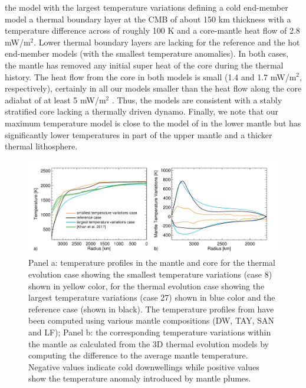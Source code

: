  the model with the largest temperature variations defining a cold end-member model  a thermal boundary layer at the CMB of about 150 km thickness with a temperature difference across of roughly 100 K and a core-mantle heat flow of 2.8 mW/m$^2$. Lower thermal boundary layers are lacking for the reference and the hot end-member models (with the smallest temperature anomalies). In both cases, the mantle has removed any initial super heat of the core during the thermal history. The heat flow from the core in both models is small (1.4 and 1.7 mW/m$^2$, respectively), certainly in all our models smaller than the heat flow along the core adiabat of at least 5 mW/m$^2$ \citep{Nimmo2000}. Thus, the models are consistent with a stably stratified core lacking a thermally driven dynamo. Finally, we note that our maximum temperature model is close to the model of \citet{Zharkov2009} in the lower mantle but has significantly lower temperatures in part of the upper mantle and a thicker thermal lithosphere. 
%
\begin{figure}[h!]
\begin{center}
\includegraphics[width=\textwidth]
{figures/Fig4ab.png}
\caption{Panel a: temperature profiles in the mantle and core for the thermal evolution case showing the smallest temperature variations (case 8) shown in yellow color, for the thermal evolution case showing the largest temperature variations (case 27) shown in blue color and the reference case (shown in black). The temperature profiles from \citet{Khan2018} have been computed using various mantle compositions (DW, TAY, SAN and LF); Panel b: the corresponding temperature variations within the mantle as calculated from the 3D thermal evolution models by computing the difference to the average mantle temperature. Negative values indicate cold downwellings while positive values show the temperature anomaly introduced by mantle plumes.}
\label{fig:Fig4ab.png} 
\end{center}
\end{figure}
